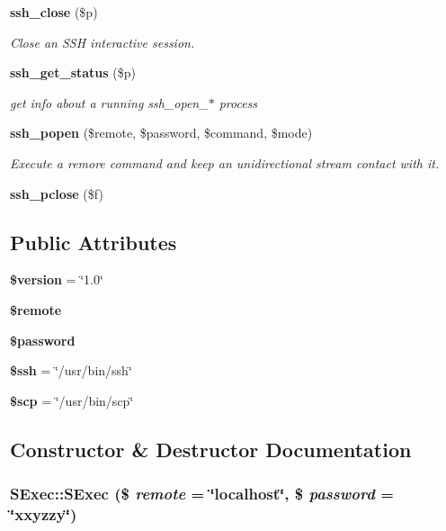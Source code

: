 \begin{CompactItemize}
{\bf ssh\_\-close} (\$p)
\begin{CompactList}\small\item\em Close an SSH interactive session. \item\end{CompactList}\item 
{\bf ssh\_\-get\_\-status} (\$p)
\begin{CompactList}\small\item\em get info about a running ssh\_\-open\_\-$\ast$ process \item\end{CompactList}\item 
{\bf ssh\_\-popen} (\$remote, \$password, \$command, \$mode)
\begin{CompactList}\small\item\em Execute a remore command and keep an unidirectional stream contact with it. \item\end{CompactList}\item 
{\bf ssh\_\-pclose} (\$f)
\end{CompactItemize}
\subsection*{Public Attributes}
\begin{CompactItemize}
\item 
{\bf \$version} = \char`\"{}1.0\char`\"{}
\item 
{\bf \$remote}
\item 
{\bf \$password}
\item 
{\bf \$ssh} = \char`\"{}/usr/bin/ssh\char`\"{}
\item 
{\bf \$scp} = \char`\"{}/usr/bin/scp\char`\"{}
\end{CompactItemize}


\subsection{Constructor \& Destructor Documentation}
\subsubsection{\setlength{\rightskip}{0pt plus 5cm}SExec::SExec (\$ {\em remote} = \char`\"{}localhost\char`\"{}, \$ {\em password} = \char`\"{}xxyzzy\char`\"{})}\label{classSExec_a0}





